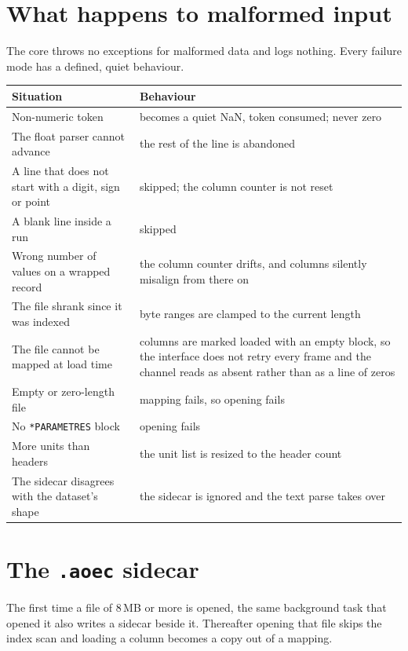 \documentclass[11pt,a4paper,oneside]{report}
\newcommand{\code}[1]{\texttt{#1}}
\begin{document}
\section{What happens to malformed input}

The core throws no exceptions for malformed data and logs nothing. Every failure
mode has a defined, quiet behaviour.

\begin{center}
\small
\begin{tabular}{@{}p{}p{}@{}}
\toprule
\textbf{Situation} & \textbf{Behaviour} \\
\midrule
Non-numeric token & becomes a quiet NaN, token consumed; never zero \\
The float parser cannot advance & the rest of the line is abandoned \\
A line that does not start with a digit, sign or point & skipped; the column counter is not reset \\
A blank line inside a run & skipped \\
Wrong number of values on a wrapped record & the column counter drifts, and columns silently misalign from there on \\
The file shrank since it was indexed & byte ranges are clamped to the current length \\
The file cannot be mapped at load time & columns are marked loaded with an empty block, so the interface does not retry every frame and the channel reads as absent rather than as a line of zeros \\
Empty or zero-length file & mapping fails, so opening fails \\
No \code{*PARAMETRES} block & opening fails \\
More units than headers & the unit list is resized to the header count \\
The sidecar disagrees with the dataset's shape & the sidecar is ignored and the text parse takes over \\
\bottomrule
\end{tabular}
\end{center}

\section{The \code{.aoec} sidecar}

The first time a file of 8\,MB or more is opened, the same background task that
opened it also writes a sidecar beside it. Thereafter opening that file skips the
index scan and loading a column becomes a copy out of a mapping.
\end{document}
